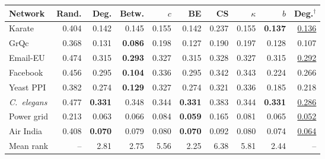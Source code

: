 \setlength{\tabcolsep}{2.4pt}\footnotesize
\begin{tabular}{l rrrrrrrrr}
\toprule
Network & Rand. & Deg. & Betw. & $c$ & BE & CS & $\kappa$ & $b$ & Deg.$^\dagger$\\
\midrule
Karate & 0.404 & 0.142 & 0.145 & 0.155 & 0.142 & 0.237 & 0.155 & \textbf{0.137} & \underline{0.136}\\
GrQc & 0.368 & 0.131 & \textbf{0.086} & 0.198 & 0.127 & 0.190 & 0.197 & 0.128 & 0.107\\
Email-EU & 0.474 & 0.315 & \textbf{0.293} & 0.327 & 0.315 & 0.328 & 0.327 & 0.315 & \underline{0.292}\\
Facebook & 0.456 & 0.295 & \textbf{0.104} & 0.336 & 0.295 & 0.342 & 0.343 & 0.224 & 0.266\\
\midrule
Yeast PPI & 0.382 & 0.274 & \textbf{0.129} & 0.327 & 0.274 & 0.321 & 0.336 & 0.185 & 0.218\\
\emph{C.~elegans} & 0.477 & \textbf{0.331} & 0.348 & 0.344 & \textbf{0.331} & 0.383 & 0.344 & \textbf{0.331} & \underline{0.286}\\
\midrule
Power grid & 0.213 & 0.063 & 0.066 & 0.084 & \textbf{0.059} & 0.165 & 0.081 & 0.065 & \underline{0.052}\\
Air India & 0.408 & \textbf{0.070} & 0.079 & 0.080 & \textbf{0.070} & 0.092 & 0.080 & 0.074 & \underline{0.064}\\
\midrule
Mean rank & -- & 2.81 & 2.75 & 5.56 & 2.25 & 6.38 & 5.81 & 2.44 & --\\
\bottomrule
\end{tabular}